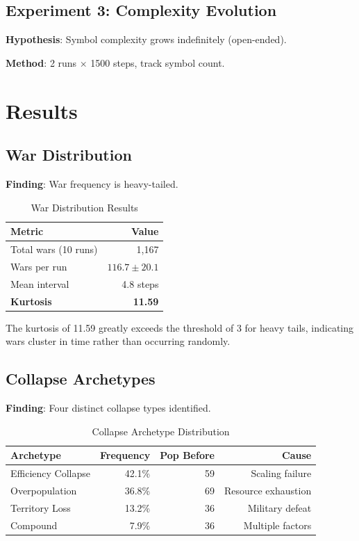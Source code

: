 \documentclass[11pt,a4paper]{article}
\begin{document}
\subsection{Experiment 3: Complexity Evolution}

\textbf{Hypothesis}: Symbol complexity grows indefinitely (open-ended).

\textbf{Method}: 2 runs $\times$ 1500 steps, track symbol count.

\section{Results}

\subsection{War Distribution}

\textbf{Finding}: War frequency is heavy-tailed.

\begin{table}[htbp]
\centering
\caption{War Distribution Results}
\label{tab:wars}
\begin{tabular}{@{}lr@{}}
\toprule
Metric & Value \\
\midrule
Total wars (10 runs) & 1,167 \\
Wars per run & $116.7 \pm 20.1$ \\
Mean interval & 4.8 steps \\
\textbf{Kurtosis} & \textbf{11.59} \\
\bottomrule
\end{tabular}
\end{table}

The kurtosis of 11.59 greatly exceeds the threshold of 3 for heavy tails, indicating wars cluster in time rather than occurring randomly.

\subsection{Collapse Archetypes}

\textbf{Finding}: Four distinct collapse types identified.

\begin{table}[htbp]
\centering
\caption{Collapse Archetype Distribution}
\label{tab:collapses}
\begin{tabular}{@{}lrrr@{}}
\toprule
Archetype & Frequency & Pop Before & Cause \\
\midrule
Efficiency Collapse & 42.1\% & 59 & Scaling failure \\
Overpopulation & 36.8\% & 69 & Resource exhaustion \\
Territory Loss & 13.2\% & 36 & Military defeat \\
Compound & 7.9\% & 36 & Multiple factors \\
\bottomrule
\end{tabular}
\end{table}
\end{document}
